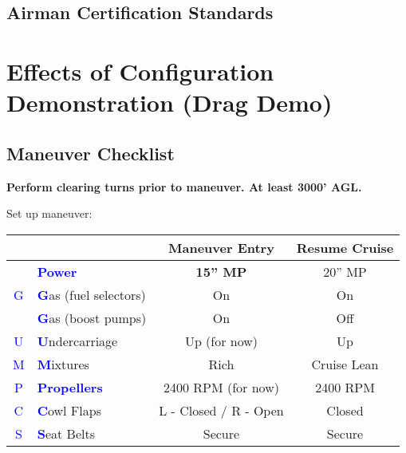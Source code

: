 {\subsection{Airman Certification Standards}
\newpage

\section{Effects of Configuration Demonstration (Drag Demo)}
\subsection{Maneuver Checklist}

\textbf{Perform clearing turns prior to maneuver. At least 3000' AGL.}

Set up maneuver:

\begin{table}[H]
\centering
\begin{tabular}{|c|l|c|c|}
\hline
                    &                                                 & \textbf{Maneuver Entry} & \textbf{Resume Cruise} \\ \hline
                    & \textcolor{blue}{\textbf{Power}}                & \textbf{15'' MP}        & 20'' MP                \\ \hline
\textcolor{blue}{G} & \textcolor{blue}{\textbf{G}}as (fuel selectors) & On                      & On                     \\
                    & \textcolor{blue}{\textbf{G}}as (boost pumps)    & On                      & Off                    \\ \hline
\textcolor{blue}{U} & \textcolor{blue}{\textbf{U}}ndercarriage        & Up (for now)            & Up                     \\ \hline
\textcolor{blue}{M} & \textcolor{blue}{\textbf{M}}ixtures             & Rich                    & Cruise Lean            \\ \hline
\textcolor{blue}{P} & \textcolor{blue}{\textbf{Propellers}}           & 2400 RPM (for now)      & 2400 RPM               \\ \hline
\textcolor{blue}{C} & \textcolor{blue}{\textbf{C}}owl Flaps           & L - Closed / R - Open   & Closed                 \\ \hline
\textcolor{blue}{S} & \textcolor{blue}{\textbf{S}}eat Belts           & Secure                  & Secure                 \\ \hline
\end{tabular}
\end{table}

}
